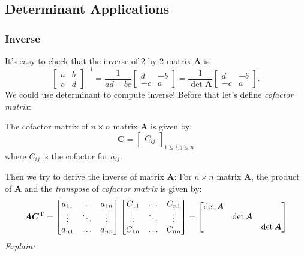 \subsection{Determinant Applications}
\subsubsection{Inverse}
It's easy to check that the inverse of 2 by 2 matrix $\bm A$ is 
\[
\begin{bmatrix}
a&b\\c&d
\end{bmatrix}^{-1}=\frac{1}{ad-bc}\begin{bmatrix}
d&-b\\-c&a
\end{bmatrix}=\frac{1}{\det\bm A}\begin{bmatrix}
d&-b\\-c&a
\end{bmatrix}.
\]
We could use determinant to compute inverse! Before that let's define \emph{cofactor matrix}:
\begin{definition}
The cofactor matrix of $n\times n$ matrix $\bm A$ is given by:
\[
\bm C=\begin{bmatrix}
C_{ij}
\end{bmatrix}_{1\le i,j\le n}
\]
where $C_{ij}$ is the cofactor for $a_{ij}$.
\end{definition}
Then we try to derive the inverse of matrix $\bm A$:
For $n\times n$ matrix $\bm A$, the product of $\bm A$ and the \emph{transpose} of \textit{cofactor matrix} is given by:
\begin{equation}\label{11.1}
\bm A\bm C^{\mathrm T}=\begin{bmatrix}
a_{11}&\dots&a_{1n}\\\vdots&\ddots&\vdots\\a_{n1}&\dots&a_{nn}
\end{bmatrix}\begin{bmatrix}
C_{11}&\dots&C_{n1}\\\vdots&\ddots&\vdots\\C_{1n}&\dots&C_{nn}
\end{bmatrix}=\begin{bmatrix}
\det\bm A&&\\&\det\bm A&\\&&\det\bm A
\end{bmatrix}
\end{equation}
\emph{Explain:} 
